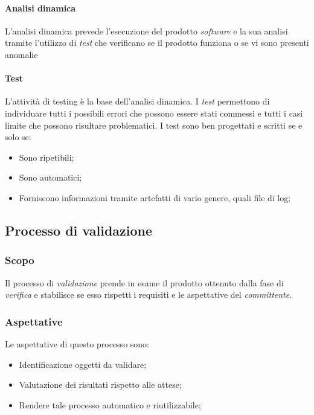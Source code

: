 						\paragraph*{Analisi dinamica}
						\aCapo{}  
							L'analisi dinamica prevede l'esecuzione del prodotto \emph{software} e la sua analisi tramite l'utilizzo di \emph{test} che verificano se il prodotto funziona o se vi sono presenti anomalie
						\paragraph*{Test}
						\aCapo{}  
							L'attività di testing è la base dell'analisi dinamica. I \emph{test} permettono di individuare tutti i possibili errori che possono essere stati commessi e tutti i casi limite che possono risultare problematici. \newline
							I test sono ben progettati e scritti se e solo se:
								\begin{itemize}
									\item Sono ripetibili;
									\item Sono automatici;
									\item Forniscono informazioni tramite artefatti di vario genere, quali file di log;
								\end{itemize}
		
		\subsection{Processo di validazione}
			\subsubsection{Scopo}
				Il processo di \emph{validazione} prende in esame il prodotto ottenuto dalla fase di \emph{verifica} e stabilisce se esso rispetti i requisiti e le aspettative del \emph{committente}.
			\subsubsection{Aspettative}
				Le aspettative di questo processo sono:
					\begin{itemize}
						\item Identificazione oggetti da validare;
						\item Valutazione dei risultati rispetto alle attese;
						\item Rendere tale processo automatico e riutilizzabile;
					\end{itemize}
